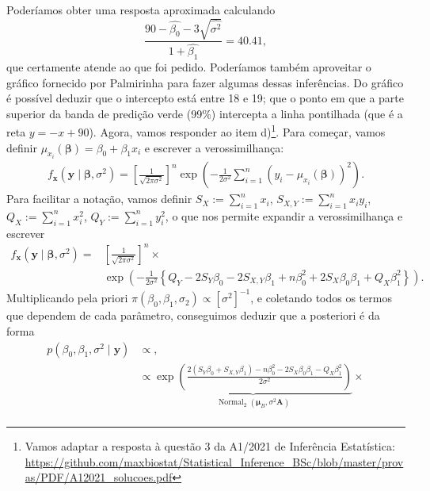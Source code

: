 {Poderíamos obter uma resposta aproximada calculando
\begin{equation*}
     \frac{90 -  \hat{\beta_0} - 3\sqrt{\hat{\sigma^2}}}{1 + \hat{\beta_1}} = 40.41,
\end{equation*}
que certamente atende ao que foi pedido.
 Poderíamos também aproveitar o gráfico fornecido por Palmirinha para fazer algumas dessas inferências.
 Do gráfico é possível deduzir que o intercepto está entre 18 e 19; que o ponto em que a parte superior da banda de predição verde (99\%) intercepta a linha pontilhada (que é a reta $y = -x + 90$).
 Agora, vamos responder ao item d)\footnote{Vamos adaptar a resposta à questão 3 da A1/2021 de Inferência Estatística: \url{https://github.com/maxbiostat/Statistical_Inference_BSc/blob/master/provas/PDF/A12021_solucoes.pdf}}.
 Para começar, vamos definir $\mu_{x_i}(\boldsymbol{\beta}) = \beta_0 + \beta_1 x_i$ e escrever a verossimilhança:
\begin{align*}
 f_{\boldsymbol{x}}(\boldsymbol{y} \mid \boldsymbol{\beta}, \sigma^2) = \left[\frac{1}{\sqrt{2\pi \sigma^2}}\right]^n \exp\left(-\frac{1}{2\sigma^2}\sum_{i=1}^n (y_i -\mu_{x_i}(\boldsymbol{\beta}))^2\right).
\end{align*}
Para facilitar a notação, vamos definir $S_X := \sum_{i=1}^n x_i$, $S_{X,Y} := \sum_{i=1}^n x_iy_i$,  $Q_X := \sum_{i=1}^n x_i^2$, $Q_Y := \sum_{i=1}^n y_i^2$, o que nos permite expandir a verossimilhança e escrever
\begin{align*}
 f_{\boldsymbol{x}}(\boldsymbol{y} \mid \boldsymbol{\beta}, \sigma^2) = & \left[\frac{1}{\sqrt{2\pi \sigma^2}}\right]^n  \times \\ & \exp\left(-\frac{1}{2\sigma^2} \left\{Q_Y - 2S_Y\beta_0 - 2S_{X,Y}\beta_1 + n\beta_0^2 + 2S_X\beta_0\beta_1 + Q_X\beta_1^2\right\} \right).
\end{align*}
Multiplicando pela priori $\pi(\beta_0, \beta_1, \sigma_2) \propto [\sigma^2]^{-1}$, e coletando todos os termos que dependem de cada parâmetro, conseguimos deduzir que a posteriori é da forma
\begin{align}
\nonumber
 p(\beta_0, \beta_1, \sigma^2 \mid \boldsymbol{y}) &\propto ,\\
 \nonumber
 &\propto \underbrace{\exp\left(\frac{2(S_Y\beta_0 + S_{X,Y}\beta_1) - n\beta_0^2 - 2S_X\beta_0\beta_1 - Q_X\beta_1^2}{2\sigma^2}\right)}_{\operatorname{Normal}_2(\boldsymbol{\mu}_B, \sigma^2\boldsymbol{A})} \times\\ &

\end{align}}
